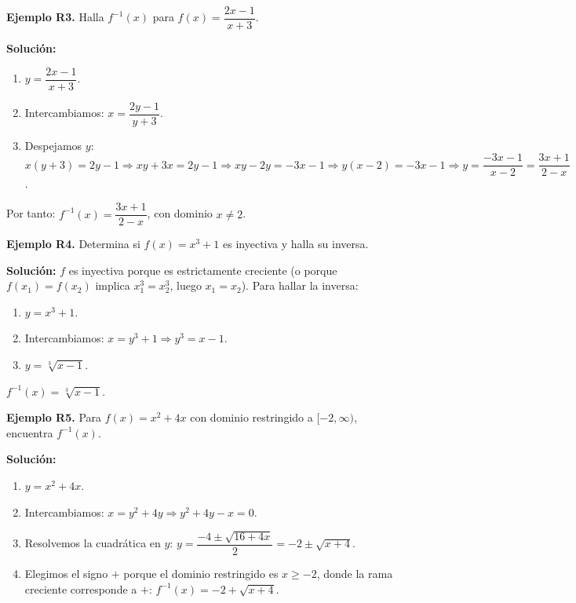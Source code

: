 \documentclass[12pt, a4paper]{article}
\begin{document}
\textbf{Ejemplo R3.} Halla $f^{-1}(x)$ para $f(x) = \dfrac{2x - 1}{x + 3}$.

\begin{cuadrosolucion}
  \textbf{Solución:}
  \begin{enumerate}
    \item $y = \dfrac{2x - 1}{x + 3}$.
    \item Intercambiamos: $x = \dfrac{2y - 1}{y + 3}$.
    \item Despejamos $y$: $x(y + 3) = 2y - 1 \Rightarrow xy + 3x = 2y - 1 \Rightarrow xy - 2y = -3x - 1 \Rightarrow y(x - 2) = -3x - 1 \Rightarrow y = \dfrac{-3x - 1}{x - 2} = \dfrac{3x + 1}{2 - x}$.
  \end{enumerate}
  Por tanto: $f^{-1}(x) = \dfrac{3x + 1}{2 - x}$, con dominio $x \neq 2$.
\end{cuadrosolucion}

\textbf{Ejemplo R4.} Determina si $f(x) = x^3 + 1$ es inyectiva y halla su inversa.

\begin{cuadrosolucion}
  \textbf{Solución:} $f$ es inyectiva porque es estrictamente creciente (o porque $f(x_1) = f(x_2)$ implica $x_1^3 = x_2^3$, luego $x_1 = x_2$). Para hallar la inversa:
  \begin{enumerate}
    \item $y = x^3 + 1$.
    \item Intercambiamos: $x = y^3 + 1 \Rightarrow y^3 = x - 1$.
    \item $y = \sqrt[3]{x - 1}$.
  \end{enumerate}
  $f^{-1}(x) = \sqrt[3]{x - 1}$.
\end{cuadrosolucion}

\newpage

\textbf{Ejemplo R5.} Para $f(x) = x^2 + 4x$ con dominio restringido a $[-2, \infty)$, encuentra $f^{-1}(x)$.

\begin{cuadrosolucion}
  \textbf{Solución:}
  \begin{enumerate}
    \item $y = x^2 + 4x$.
    \item Intercambiamos: $x = y^2 + 4y \Rightarrow y^2 + 4y - x = 0$.
    \item Resolvemos la cuadrática en $y$: $y = \dfrac{-4 \pm \sqrt{16 + 4x}}{2} = -2 \pm \sqrt{x + 4}$.
    \item Elegimos el signo $+$ porque el dominio restringido es $x \geq -2$, donde la rama creciente corresponde a $+$:
          $f^{-1}(x) = -2 + \sqrt{x + 4}$.
  \end{enumerate}
\end{cuadrosolucion}
\end{document}
